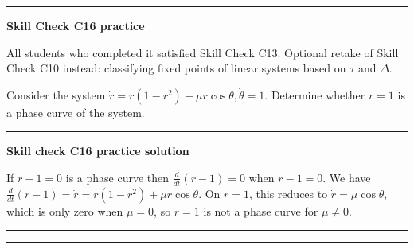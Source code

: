\documentclass[12pt,letterpaper,noanswers]{exam}
\begin{document}
\vspace{0.2cm}
\hrule
\vspace{0.2cm}


\noindent\textbf{Skill Check C16 practice}
\begin{questions}
\item All students who completed it satisfied Skill Check C13.  Optional retake of Skill Check C10 instead: classifying fixed points of linear systems based on $\tau$ and $\Delta$.

\item Consider the system $\dot r = r(1-r^2)+\mu r\cos\theta, \dot\theta = 1$.  Determine whether $r = 1$ is a phase curve of the system.

\vspace{0.2cm}

\hrule
\vspace{0.2cm}
\end{questions}



\noindent\textbf{Skill check C16 practice solution}

If $r-1 = 0$ is a phase curve then $\frac{d}{dt}(r-1) = 0$ when $r-1 = 0$.  We have $\frac{d}{dt}(r-1) = \dot r = r(1-r^2)+\mu r\cos\theta$.  On $r = 1$, this reduces to $\dot r = \mu\cos\theta$, which is only zero when $\mu = 0$, so $r=1$ is not a phase curve for $\mu\neq 0$.


\vspace{0.2cm}
\hrule
\vspace{0.2cm}





\eject



\vspace{0.2cm}

\hrule
\vspace{0.2cm}
\end{document}
